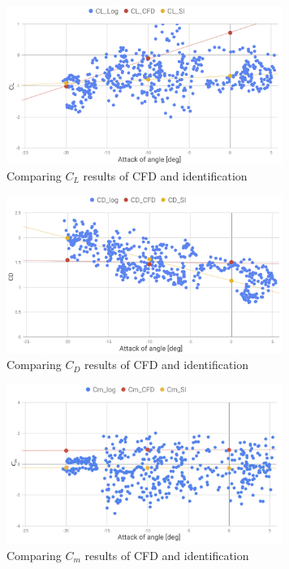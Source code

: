 \begin{figure}[H]
  \centering
  \includegraphics[clip,width=9cm,bb=0 0 2220 1270]{./z_figure_files/chapter5/cfd_CL.jpeg}
  \caption{\small{Comparing $C_L$ results of CFD and identification}}
  \label{fig:cfd_L}
\end{figure}
\begin{figure}[H]
  \centering
  \includegraphics[clip,width=9cm,bb=0 0 2220 1270]{./z_figure_files/chapter5/cfd_CD.jpeg}
  \caption{\small{Comparing $C_D$ results of CFD and identification}}
  \label{fig:cfd_D}
\end{figure}
\begin{figure}[H]
  \centering
    \includegraphics[clip,width=9cm,bb=0 0 1024 590]{./z_figure_files/chapter5/cfd_Cm.jpeg}
    \caption{\small{Comparing $C_m$ results of CFD and identification}}
    \label{fig:cfd_Ma}
\end{figure}
